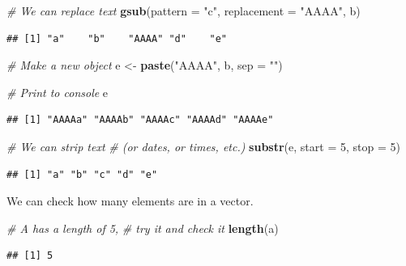 \documentclass[
]{book}
\newenvironment{Shaded}{\begin{snugshade}}{\end{snugshade}}
\newcommand{\CommentTok}[1]{\textcolor[rgb]{0.56,0.35,0.01}{\textit{#1}}}
\newcommand{\DataTypeTok}[1]{\textcolor[rgb]{0.13,0.29,0.53}{#1}}
\newcommand{\DecValTok}[1]{\textcolor[rgb]{0.00,0.00,0.81}{#1}}
\newcommand{\KeywordTok}[1]{\textcolor[rgb]{0.13,0.29,0.53}{\textbf{#1}}}
\newcommand{\NormalTok}[1]{#1}
\newcommand{\StringTok}[1]{\textcolor[rgb]{0.31,0.60,0.02}{#1}}
\begin{document}
\begin{Shaded}
\begin{Highlighting}[]
\CommentTok{# We can replace text}
\KeywordTok{gsub}\NormalTok{(}\DataTypeTok{pattern =} \StringTok{"c"}\NormalTok{, }\DataTypeTok{replacement =} \StringTok{"AAAA"}\NormalTok{, b)}
\end{Highlighting}
\end{Shaded}

\begin{verbatim}
## [1] "a"    "b"    "AAAA" "d"    "e"
\end{verbatim}

\begin{Shaded}
\begin{Highlighting}[]
\CommentTok{# Make a new object}
\NormalTok{e <-}\StringTok{ }\KeywordTok{paste}\NormalTok{(}\StringTok{"AAAA"}\NormalTok{, b, }\DataTypeTok{sep =} \StringTok{""}\NormalTok{)}

\CommentTok{# Print to console}
\NormalTok{e}
\end{Highlighting}
\end{Shaded}

\begin{verbatim}
## [1] "AAAAa" "AAAAb" "AAAAc" "AAAAd" "AAAAe"
\end{verbatim}

\begin{Shaded}
\begin{Highlighting}[]
\CommentTok{# We can strip text}
\CommentTok{# (or dates, or times, etc.)}
\KeywordTok{substr}\NormalTok{(e, }\DataTypeTok{start =} \DecValTok{5}\NormalTok{, }\DataTypeTok{stop =} \DecValTok{5}\NormalTok{)}
\end{Highlighting}
\end{Shaded}

\begin{verbatim}
## [1] "a" "b" "c" "d" "e"
\end{verbatim}

We can check how many elements are in a vector.

\begin{Shaded}
\begin{Highlighting}[]
\CommentTok{# A has a length of 5,}
\CommentTok{# try it and check it}
\KeywordTok{length}\NormalTok{(a)}
\end{Highlighting}
\end{Shaded}

\begin{verbatim}
## [1] 5
\end{verbatim}
\end{document}

